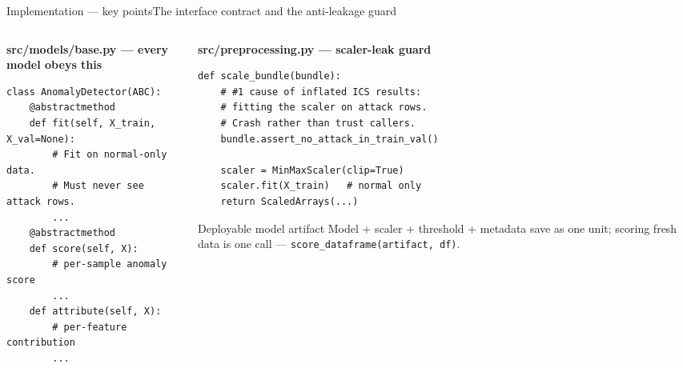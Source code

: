 \documentclass[aspectratio=169,11pt]{beamer}
\begin{document}
\begin{frame}[fragile]{Implementation --- key points}{The interface contract and the anti-leakage guard}
\begin{columns}[T]
\begin{column}{0.5\textwidth}
{\color{navy}\bfseries\footnotesize src/models/base.py --- every model obeys this}
\begin{Verbatim}
class AnomalyDetector(ABC):
    @abstractmethod
    def fit(self, X_train, X_val=None):
        # Fit on normal-only data.
        # Must never see attack rows.
        ...
    @abstractmethod
    def score(self, X):
        # per-sample anomaly score
        ...
    def attribute(self, X):
        # per-feature contribution
        ...
\end{Verbatim}
\end{column}
\begin{column}{0.5\textwidth}
{\color{navy}\bfseries\footnotesize src/preprocessing.py --- scaler-leak guard}
\begin{Verbatim}
def scale_bundle(bundle):
    # #1 cause of inflated ICS results:
    # fitting the scaler on attack rows.
    # Crash rather than trust callers.
    bundle.assert_no_attack_in_train_val()

    scaler = MinMaxScaler(clip=True)
    scaler.fit(X_train)   # normal only
    return ScaledArrays(...)
\end{Verbatim}
\vspace{0.5mm}
\begin{block}{Deployable model artifact}
\scriptsize Model + scaler + threshold + metadata save as one unit; scoring fresh data is one call --- \texttt{score\_dataframe(artifact, df)}.
\end{block}
\end{column}
\end{columns}
\end{frame}
\end{document}
